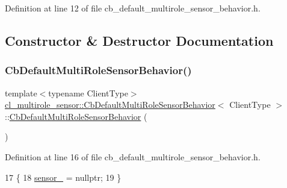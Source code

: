 Definition at line 12 of file cb\+\_\+default\+\_\+multirole\+\_\+sensor\+\_\+behavior.\+h.



\subsection{Constructor \& Destructor Documentation}
\mbox{\label{classcl__multirole__sensor_1_1CbDefaultMultiRoleSensorBehavior_af4228e5fdc6401b13f66bb066c28ec39}} 
\subsubsection{\texorpdfstring{Cb\+Default\+Multi\+Role\+Sensor\+Behavior()}{CbDefaultMultiRoleSensorBehavior()}}
{\footnotesize\ttfamily template$<$typename Client\+Type$>$ \\
\hyperlink{classcl__multirole__sensor_1_1CbDefaultMultiRoleSensorBehavior}{cl\+\_\+multirole\+\_\+sensor\+::\+Cb\+Default\+Multi\+Role\+Sensor\+Behavior}$<$ Client\+Type $>$\+::\hyperlink{classcl__multirole__sensor_1_1CbDefaultMultiRoleSensorBehavior}{Cb\+Default\+Multi\+Role\+Sensor\+Behavior} (\begin{DoxyParamCaption}{ }\end{DoxyParamCaption})\hspace{0.3cm}{\ttfamily [inline]}}



Definition at line 16 of file cb\+\_\+default\+\_\+multirole\+\_\+sensor\+\_\+behavior.\+h.


\begin{DoxyCode}
17   \{
18     \hyperlink{classcl__multirole__sensor_1_1CbDefaultMultiRoleSensorBehavior_a201893c3c859259eac3166405f3509cb}{sensor\_} = \textcolor{keyword}{nullptr};
19   \}
\end{DoxyCode}


